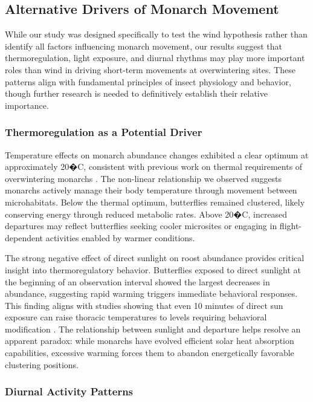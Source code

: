 \subsection{Alternative Drivers of Monarch Movement}

While our study was designed specifically to test the wind hypothesis rather than identify all factors influencing monarch movement, our results suggest that thermoregulation, light exposure, and diurnal rhythms may play more important roles than wind in driving short-term movements at overwintering sites. These patterns align with fundamental principles of insect physiology and behavior, though further research is needed to definitively establish their relative importance.

\subsubsection{Thermoregulation as a Potential Driver}

Temperature effects on monarch abundance changes exhibited a clear optimum at approximately 20�C, consistent with previous work on thermal requirements of overwintering monarchs \autocite{masters_thermal_1988}. The non-linear relationship we observed suggests monarchs actively manage their body temperature through movement between microhabitats. Below the thermal optimum, butterflies remained clustered, likely conserving energy through reduced metabolic rates. Above 20�C, increased departures may reflect butterflies seeking cooler microsites or engaging in flight-dependent activities enabled by warmer conditions.

The strong negative effect of direct sunlight on roost abundance provides critical insight into thermoregulatory behavior. Butterflies exposed to direct sunlight at the beginning of an observation interval showed the largest decreases in abundance, suggesting rapid warming triggers immediate behavioral responses. This finding aligns with studies showing that even 10 minutes of direct sun exposure can raise thoracic temperatures to levels requiring behavioral modification \autocite{masters_thermal_1988}. The relationship between sunlight and departure helps resolve an apparent paradox: while monarchs have evolved efficient solar heat absorption capabilities, excessive warming forces them to abandon energetically favorable clustering positions.

\subsubsection{Diurnal Activity Patterns}

